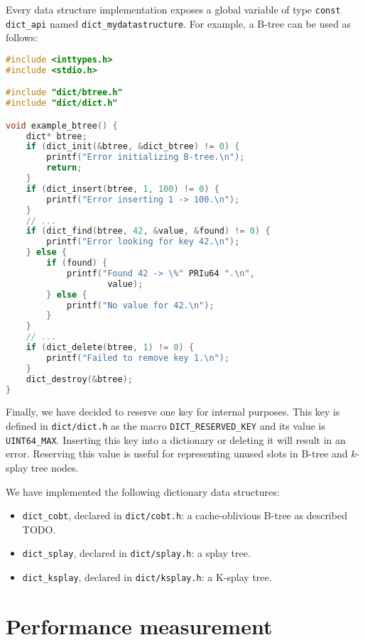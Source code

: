 Every data structure implementation exposes a global variable of type
\texttt{const dict\_api} named \texttt{dict\_mydatastructure}. For example,
a B-tree can be used as follows:

\begin{lstlisting}[language=C]
#include <inttypes.h>
#include <stdio.h>

#include "dict/btree.h"
#include "dict/dict.h"

void example_btree() {
	dict* btree;
	if (dict_init(&btree, &dict_btree) != 0) {
		printf("Error initializing B-tree.\n");
		return;
	}
	if (dict_insert(btree, 1, 100) != 0) {
		printf("Error inserting 1 -> 100.\n");
	}
	// ...
	if (dict_find(btree, 42, &value, &found) != 0) {
		printf("Error looking for key 42.\n");
	} else {
		if (found) {
			printf("Found 42 -> \%" PRIu64 ".\n",
					value);
		} else {
			printf("No value for 42.\n");
		}
	}
	// ...
	if (dict_delete(btree, 1) != 0) {
		printf("Failed to remove key 1.\n");
	}
	dict_destroy(&btree);
}
\end{lstlisting}

Finally, we have decided to reserve one key for internal purposes.
This key is defined in \texttt{dict/dict.h} as the macro
\texttt{DICT\_RESERVED\_KEY} and its value is \texttt{UINT64\_MAX}.
Inserting this key into a dictionary or deleting it will result in an error.
Reserving this value is useful for representing unused slots in B-tree
and $k$-splay tree nodes.

We have implemented the following dictionary data structures:
\begin{itemize}
\item \texttt{dict\_cobt}, declared in \texttt{dict/cobt.h}:
	a cache-oblivious B-tree as described TODO.
\item \texttt{dict\_splay}, declared in \texttt{dict/splay.h}:
	a splay tree.
\item \texttt{dict\_ksplay}, declared in \texttt{dict/ksplay.h}:
	a K-splay tree. %
\end{itemize}

\section{Performance measurement}

